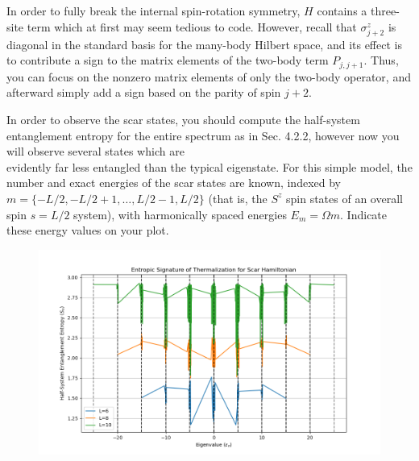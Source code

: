 \documentclass[12pt]{article}
\begin{document}
In order to fully break the internal spin-rotation symmetry, $H$ contains a three-site term which at first may seem tedious to code. However, recall that $\sigma_{j+2}^{z}$ is diagonal in the standard basis for the many-body Hilbert space, and its effect is to contribute a sign to the matrix elements of the two-body term $P_{j, j+1}$. Thus, you can focus on the nonzero matrix elements of only the two-body operator, and afterward simply add a sign based on the parity of spin $j+2$.

In order to observe the scar states, you should compute the half-system entanglement entropy for the entire spectrum as in Sec. 4.2.2, however now you will observe several states which are\\
evidently far less entangled than the typical eigenstate. For this simple model, the number and exact energies of the scar states are known, indexed by $m=\{-L / 2,-L / 2+1, \ldots, L / 2-1, L / 2\}$ (that is, the $S^{z}$ spin states of an overall spin $s=L / 2$ system), with harmonically spaced energies $E_{m}=\Omega m$. Indicate these energy values on your plot.
\newpage
\begin{figure}
\centering
\includegraphics[width=\textwidth]{p4_3_scars_entropic_signature.png}
\end{figure}
\end{document}
